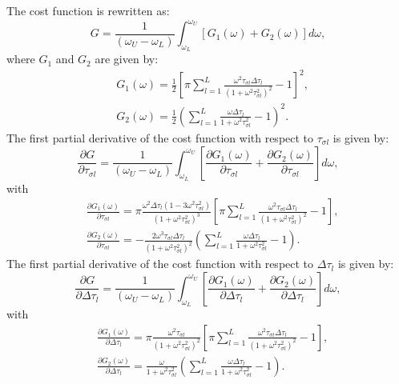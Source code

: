 \documentclass[article]{./macros/elsarticle_qh}
\begin{document}
The cost function is rewritten as:
\begin{equation} 
G = \frac{1}{(\omega_{U}-\omega_{L})} \int_{\omega_{L}}^{\omega_{U}} 
\left[
G_{1}(\omega) + G_{2}(\omega)
\right]
d\omega ,
\end{equation}
where $G_{1}$ and $G_{2}$ are given by:
\begin{align}
& G_{1}(\omega) = \frac{1}{2}
\left[\pi \sum_{l=1}^{L} \frac{\omega^2 \tau_{\sigma l} \Delta \tau_{l}}
{(1+\omega^2 \tau_{\sigma l}^2)^2} - 1 \right]^2, \\
& G_{2}(\omega) = \frac{1}{2}
\left(
\sum_{l=1}^{L}
\frac{\omega \Delta \tau_{l}}{1+\omega^2 \tau_{\sigma l}^2} - 1
\right)^2 .
\end{align} 
The first partial derivative of the cost function with respect to $\tau_{\sigma l}$ is given by:
\begin{equation} 
\frac{\partial G}{\partial \tau_{\sigma l}} = \frac{1}{(\omega_{U}-\omega_{L})} \int_{\omega_{L}}^{\omega_{U}} 
\left[
\frac{\partial G_{1}(\omega)}{\partial \tau_{\sigma l}} +
\frac{\partial G_{2}(\omega)}{\partial \tau_{\sigma l}}
\right]
d\omega ,
\end{equation}
with
\begin{align}
& \frac{\partial G_{1}(\omega)}{\partial \tau_{\sigma l}} =
\pi \frac{\omega^2 \Delta \tau_{l}(1-3\omega^2 \tau_{\sigma l}^2) }
{(1+\omega^2\tau_{\sigma l}^2)^3}
\left[
\pi \sum_{l=1}^{L} 
\frac{\omega^2 \tau_{\sigma l} \Delta \tau_{l}}{(1+\omega^2\tau_{\sigma l}^2)^2}
-1
\right] , \\
& \frac{\partial G_{2}(\omega)}{\partial \tau_{\sigma l}} =
-\frac{2\omega^3 \tau_{\sigma l} \Delta \tau_{l}}
{(1+\omega^2\tau_{\sigma l}^2)^2}
\left(
\sum_{l=1}^{L} 
\frac{\omega \Delta \tau_{l}}{1+\omega^2\tau_{\sigma l}^2} -1
\right) .
\end{align} 
The first partial derivative of the cost function with respect to $\Delta \tau_{l}$ is given by:
\begin{equation} 
\frac{\partial G}{\partial \Delta \tau_{l}} = \frac{1}{(\omega_{U}-\omega_{L})} \int_{\omega_{L}}^{\omega_{U}} 
\left[
\frac{\partial G_{1}(\omega)}{\partial \Delta \tau_{l}} +
\frac{\partial G_{2}(\omega)}{\partial \Delta \tau_{l}}
\right]
d\omega ,
\end{equation}
with
\begin{align}
& \frac{\partial G_{1}(\omega)}{\partial \Delta \tau_{l}} =
\pi \frac{\omega^2 \tau_{\sigma l}}
{(1+\omega^2\tau_{\sigma l}^2)^2}
\left[
\pi \sum_{l=1}^{L} 
\frac{\omega^2 \tau_{\sigma l} \Delta \tau_{l}}{(1+\omega^2\tau_{\sigma l}^2)^2}
-1
\right] , \\
& \frac{\partial G_{2}(\omega)}{\partial \Delta \tau_{l}} = 
\frac{\omega}{1+\omega^2\tau_{\sigma l}^2}
\left(
\sum_{l=1}^{L} 
\frac{\omega \Delta \tau_{l}}{1+\omega^2\tau_{\sigma l}^2} -1
\right) .
\end{align}
\end{document}
